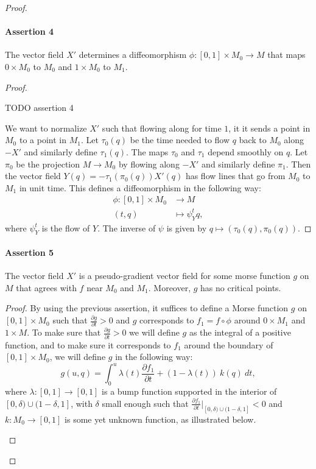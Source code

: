 \begin{proof}
\paragraph{Assertion 4}
The vector field $X'$ determines a diffeomorphism $\phi: [0, 1] \times M_0 \to M$ that maps $0 \times M_0$ to $M_0$ and $1 \times M_0$ to $ M_1$.
\begin{proof}
    \begin{marginfigure}
        \centering
        \caption{TODO assertion 4}
        \label{fig:assertion-4}
    \end{marginfigure}
    We want to normalize $X'$ such that flowing along for time $1$, it it sends a point in  $M_0$ to a point in $M_1$.
    Let $\tau_0(q)$ be the time needed to flow $q$ back to $M_0$ along $-X'$ and similarly define $\tau_1(q)$. The maps $\tau_0$ and $\tau_1$ depend smoothly on $q$.
    Let $\pi_0$ be the projection  $M \to M_0$ by flowing along $-X'$ and similarly define $\pi_1$.
    Then the vector field $Y(q) = -\tau_1(\pi_0(q)) X'(q)$ has flow lines that go from $ M_0$ to $M_1$ in unit time.
    This defines a diffeomorphism in the following way:
    \begin{align*}
        \phi: [0, 1] \times M_0 &\longrightarrow M \\
        (t, q) &\longmapsto \psi^{t}_Y q
    ,\end{align*}
    where $\psi^{t}_Y$ is the flow of $Y$.
    The inverse of $\psi$ is given by  $q \mapsto (\tau_0(q), \pi_0(q))$.
\end{proof}

\paragraph{Assertion 5}
The vector field $X'$ is a pseudo-gradient vector field for some morse function  $g$ on $M$ that agrees with $f$ near  $M_0$ and $M_1$.
Moreover, $g$ has no critical points.
\begin{proof}
    By using the previous assertion,
    it suffices to define a Morse function $g$ on $[0, 1] \times M_0$ such that $\frac{\partial g}{\partial t} > 0$ and $g$ corresponds to  $ f_1 = f  \circ  \phi$ around $0 \times M_1$ and $1 \times M$.
    To make sure that $\frac{\partial g}{\partial t} > 0$ we will define $g$ as the integral of a positive function,
    and to make sure it corresponds to $f_1$ around the boundary of $[0,1] \times M_0$, we will define $g$ in the following way:
     \[
         g(u, q) = \int_0^{u} \lambda(t) \frac{\partial f_1}{\partial t} + (1-\lambda(t))\: k(q) \: dt
    ,\] 
    where $\lambda: [0,1] \to  [0,1]$ is a bump function supported in the interior of $[0, \delta) \cup (1-\delta, 1]$, with $\delta$ small enough such that $\frac{\partial f_1}{\partial t}\big|_{[0, \delta) \cup (1-\delta, 1]} < 0$ and $k: M_0 \to [0,1]$ is some yet unknown function, as illustrated below.
    \begin{figure}[H]
        \centering
    \end{figure}


\end{proof}
\end{proof}
